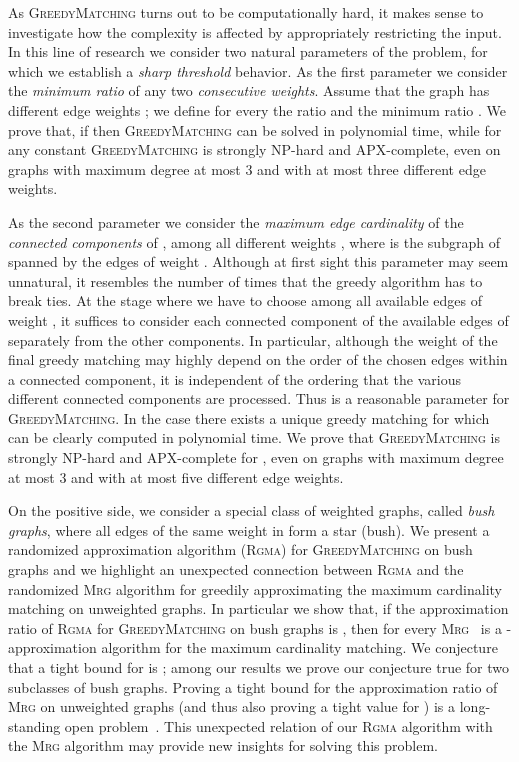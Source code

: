 \documentclass[a4paper,11pt]{article}
\newcommand{\greedy}{\textsc{GreedyMatching}\xspace}
\newcommand{\rgma}{\textsc{Rgma}\xspace}
\newcommand{\mrg}{\textsc{Mrg}\xspace}
\begin{document}
As \textsc{GreedyMatching} turns out to be computationally hard, it makes
sense to investigate how the complexity is affected by appropriately
restricting the input. In this line of research we consider two natural
parameters of the problem, for which we establish a \emph{sharp threshold} behavior. As the first parameter we consider the \emph{minimum
ratio } of any two \emph{consecutive weights}. Assume that the
graph has  different edge weights ; we
define for every  the ratio  and the minimum ratio . We prove that, if  then \textsc{GreedyMatching} can be solved in polynomial time, while for any
constant  \textsc{GreedyMatching} is strongly NP-hard and
APX-complete, even on graphs with maximum degree at most 3 and with at most
three different edge weights.

As the second parameter we consider the \emph{maximum edge cardinality}  of the \emph{connected components} of , among all different
weights , where  is the subgraph of  spanned by the edges
of weight . Although at first sight this parameter may seem
unnatural, it resembles the number of times that the greedy algorithm has to
break ties. At the stage where we have to choose among all available edges
of weight , it suffices to consider each connected component of the
available edges of  separately from the other components. In
particular, although the weight of the final greedy matching may highly
depend on the order of the chosen edges within a connected component, it is
independent of the ordering that the various different connected components
are processed. Thus  is a reasonable parameter for \textsc{GreedyMatching}. In the case  there exists a unique greedy matching
for  which can be clearly computed in polynomial time. We prove that 
\textsc{GreedyMatching} is strongly NP-hard and APX-complete for , even on graphs with maximum degree at most 3 and with at most five
different edge weights.




On the positive side, we consider a special class of weighted graphs, called \emph{bush graphs}, where all edges of the same weight in  form a star (bush).
We present a randomized approximation algorithm (\rgma) for \greedy on bush graphs and 
we highlight an unexpected connection between \rgma and the randomized \mrg algorithm for greedily approximating the maximum cardinality matching on unweighted graphs. 
In particular we show that, if the approximation ratio of \textsc{Rgma} for \textsc{GreedyMatching} on bush graphs is , 
then for every  \textsc{Mrg}~\cite{ADFS95} is a -approximation algorithm for the maximum cardinality matching. 
We conjecture that a tight bound for  is ; among our results we prove our conjecture true for two subclasses of bush graphs. 
Proving a tight bound for the approximation ratio of \textsc{Mrg} on unweighted graphs (and thus also proving a tight value for ) is a
long-standing open problem~\cite{PS12,ADFS95,DF91}. This unexpected relation
of our \textsc{Rgma} algorithm with the \textsc{Mrg} algorithm may provide
new insights for solving this problem.
\end{document}
